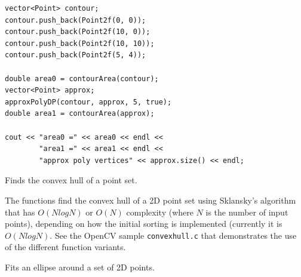 \begin{lstlisting}
vector<Point> contour;
contour.push_back(Point2f(0, 0));
contour.push_back(Point2f(10, 0));
contour.push_back(Point2f(10, 10));
contour.push_back(Point2f(5, 4));

double area0 = contourArea(contour);
vector<Point> approx;
approxPolyDP(contour, approx, 5, true);
double area1 = contourArea(approx);

cout << "area0 =" << area0 << endl <<
        "area1 =" << area1 << endl <<
        "approx poly vertices" << approx.size() << endl; 
\end{lstlisting}

Finds the convex hull of a point set.

\begin{description}
\end{description}

The functions find the convex hull of a 2D point set using Sklansky's algorithm \cite{Sklansky82} that has $O(N logN)$ or $O(N)$ complexity (where $N$ is the number of input points), depending on how the initial sorting is implemented (currently it is $O(N logN)$. See the OpenCV sample \texttt{convexhull.c} that demonstrates the use of the different function variants. 


Fits an ellipse around a set of 2D points.

